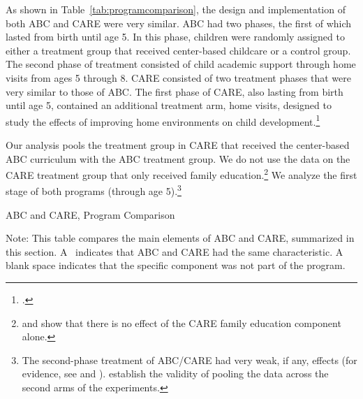 As shown in Table~\ref{tab:programcomparison}, the design and implementation of both ABC and CARE were very similar. ABC had two phases, the first of which lasted from birth until age 5. In this phase, children were randomly assigned to either a treatment group that received center-based childcare or a control group. The second phase of treatment consisted of child academic support through home visits from ages 5 through 8. CARE consisted of two treatment phases that were very similar to those of ABC. The first phase of CARE, also lasting from birth until age 5, contained an additional treatment arm, home visits, designed to study the effects of improving home environments on child development.\footnote{\citet{Wasik_Ramey_etal_1990_CD}.}

Our analysis pools the treatment group in CARE that received the center-based ABC curriculum with the ABC treatment group. We do not use the data on the CARE treatment group that only received family education.\footnote{\citet{Campbell_Conti_etal_2014_EarlyChildhoodInvestments} and \citet{ABCCARE_Dataset} show that there is no effect of the CARE family education component alone.} We analyze the first stage of both programs (through age 5).\footnote{The second-phase treatment of ABC/CARE had very weak, if any, effects (for evidence, see \citealp{Campbell_Conti_etal_2014_EarlyChildhoodInvestments} and \citealp{ABCCARE_Dataset}). \citet{Campbell_Conti_etal_2014_EarlyChildhoodInvestments} establish the validity of pooling the data across the second arms of the experiments.}

\begin{table}[!htbp]
\centering
\caption{ABC and CARE, Program Comparison} \label{tab:programcomparison}
\begin{adjustbox}{max width=\textwidth}
\begin{threeparttable}
	\small
	
\begin{tablenotes}
\small
\item Note: This table compares the main elements of ABC and CARE, summarized in this section. A \checkmark\ indicates that ABC and CARE had the same characteristic. A blank space indicates that the specific component was not part of the program.
\end{tablenotes}
\end{threeparttable}
\end{adjustbox}
\end{table}

